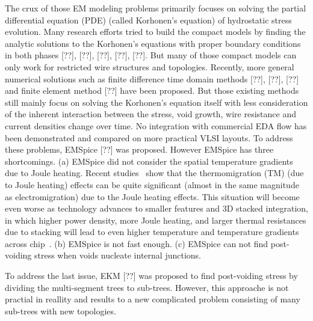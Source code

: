 The crux of those EM modeling problems primarily focuses on solving the partial differential equation
(PDE) (called Korhonen's equation) of hydrostatic stress evolution.
Many research efforts tried to build the compact models by finding the analytic
solutions to the Korhonen’s equations with proper boundary
conditions in both phases [??], [??], [??], [??], [??]. But
many of those compact models can only work for restricted
wire structures and topologies.
Recently, more general numerical solutions such as finite
difference time domain methods [??], [??], [??] and finite element
method [??] have been proposed. But those existing
methods still mainly focus on solving the Korhonen’s equation
itself with less consideration of the inherent interaction
between the stress, void growth, wire resistance and current
densities change over time. No integration with commercial
EDA flow has been demonstrated and compared on more
practical VLSI layouts.
To address these problems, EMSpice [??] was proposed. However EMSpice has three shortcomings. 
(a) EMSpice did not consider the spatial temperature gradients due to Joule heating.  Recent
  studies~\cite{Abbasinasab:DAC'2018, ChenTan:TCAD'21} show that the thermomigration 
  (TM) (due to Joule heating) effects can be quite significant (almost in the same
  magnitude as electromigration) due to the Joule heating
  effects.   This situation will become even worse as technology advances
 to smaller features and 3D stacked integration, in which higher power
 density, more Joule heating, and larger thermal resistances due to
 stacking will lead to even higher temperature and temperature
 gradients across chip~\cite{Todri:TVLSI'13}.
(b) EMSpice is not fast enough.
(c) EMSpice can not find post-voiding stress when voids nucleate internal junctions.

To address the last issue, EKM [??] was proposed to find post-voiding stress by dividing the multi-segment trees to sub-trees. 
However, this approache is not practial in reallity and results to a new complicated problem consisting of many sub-trees with new topologies.




